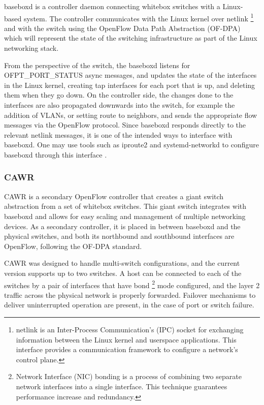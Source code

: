 baseboxd is a controller daemon connecting whitebox switches with a Linux-based system. The controller communicates with the Linux kernel over netlink 
\footnote{netlink is an Inter-Process Communication's (IPC) socket for exchanging information between the Linux kernel and userspace applications. This interface
provides a communication framework to configure a network's control plane.} and with the switch using the OpenFlow Data Path Abstraction (OF-DPA) which will
represent the state of the switching infrastructure as part of the Linux networking stack.

\par From the perspective of the switch, the baseboxd listens for OFPT\_PORT\_STATUS async messages, and updates the state of the interfaces in the Linux
kernel, creating tap interfaces for each port that is up, and deleting them when they go down. On the controller side, the changes done to the interfaces are also
propagated downwards into the switch, for example the addition of VLANs, or setting route to neighbors, and sends the appropriate flow messages via the OpenFlow 
protocol. Since baseboxd responds directly to the relevant netlink messages, it is one of the intended ways to interface with baseboxd. One may use tools such as
iproute2 and systemd-networkd to configure baseboxd through this interface \cite{bisdn_gmbh_software_2017}.

\subsubsection {CAWR}

CAWR is a secondary OpenFlow controller that creates a giant switch abstraction from a set of whitebox switches. This 
giant switch integrates with baseboxd and allows for easy scaling and management of multiple networking devices. As a secondary controller, it is placed in
between baseboxd and the physical switches, and both its northbound and southbound interfaces are OpenFlow, following the OF-DPA standard.

\par CAWR was designed to handle multi-switch configurations, and the current version supports up to two switches. A host can be connected to each of the switches by
a pair of interfaces that have bond \footnote{Network Interface (NIC) bonding is a process of combining two separate network interfaces into a single 
interface. This technique guarantees performance increase and redundancy.} mode configured, and the layer 2 traffic across the physical network is properly
forwarded. Failover mechanisms to deliver uninterrupted operation are present, in the case of port or switch failure.

